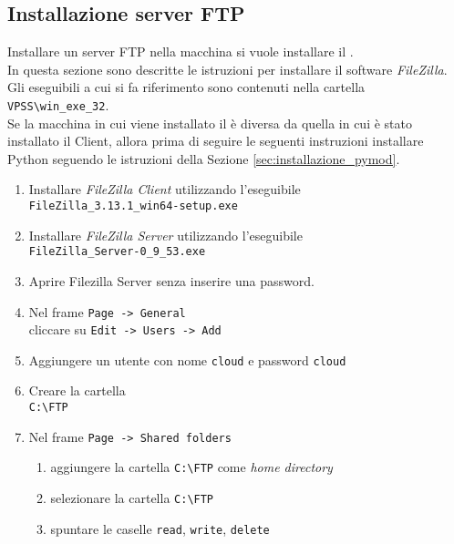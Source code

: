 \documentclass[a4paper,twoside,10pt,openany]{scrbook}
\begin{document}
\subsection{Installazione server FTP}\label{sec:installazione_ftp}
%
Installare un server FTP nella macchina si vuole installare il \sa.\\
In questa sezione sono descritte le istruzioni per installare il software \emph{FileZilla}.\\
Gli eseguibili a cui si fa riferimento sono contenuti nella cartella \texttt{VPSS\textbackslash win\_exe\_32}.\\
Se la macchina in cui viene installato il \sa è diversa da quella in cui è stato installato il Client, allora prima di seguire le seguenti instruzioni installare Python seguendo le istruzioni della Sezione \ref{sec:installazione_pymod}.
\begin{enumerate}
 \item Installare \emph{FileZilla Client} utilizzando l'eseguibile\\
       \texttt{FileZilla\_3.13.1\_win64-setup.exe}
 \item Installare \emph{FileZilla Server} utilizzando l'eseguibile\\
       \texttt{FileZilla\_Server-0\_9\_53.exe}
 \item Aprire Filezilla Server senza inserire una password.
 \item Nel frame \texttt{Page -> General}\\
       cliccare su \texttt{Edit -> Users -> Add}
 \item Aggiungere un utente con nome \texttt{cloud} e password \texttt{cloud}
 \item Creare la cartella\\
       \texttt{C:\textbackslash FTP}
 \item Nel frame \texttt{Page -> Shared folders}
       \begin{enumerate}
        \item aggiungere la cartella \texttt{C:\textbackslash FTP} come \emph{home directory}
        \item selezionare la cartella \texttt{C:\textbackslash FTP}
        \item spuntare le caselle \texttt{read}, \texttt{write}, \texttt{delete}
       \end{enumerate}
\end{enumerate}
%
\end{document}
